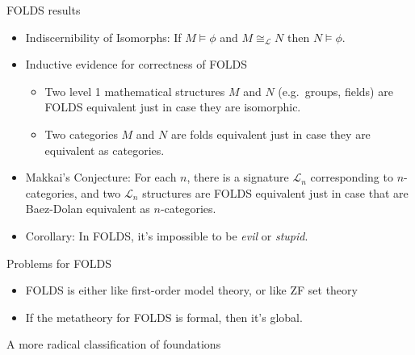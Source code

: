 \documentclass[8pt]{beamer}
\begin{document}
\begin{frame}{FOLDS results}

\begin{itemize}
\item Indiscernibility of Isomorphs: If $M\models \phi$ and $M\cong
  _{\mathcal{L}}N$ then $N\models\phi$.
\item Inductive evidence for correctness of FOLDS
\begin{itemize}
\item Two level 1 mathematical structures $M$ and $N$ (e.g.\ groups,
  fields) are FOLDS equivalent just in case they are isomorphic.
\item Two categories $M$ and $N$ are folds equivalent just in case
  they are equivalent as categories.
\end{itemize}
\item Makkai's Conjecture: For each $n$, there is a signature
  $\mathcal{L}_n$ corresponding to $n$-categories, and two
  $\mathcal{L}_n$ structures are FOLDS equivalent just in case that
  are Baez-Dolan equivalent as $n$-categories.
\item Corollary: In FOLDS, it's impossible to be \emph{evil} or
  \emph{stupid}.
\end{itemize}


\end{frame}


\begin{frame}{Problems for FOLDS}

\begin{itemize}
\item FOLDS is either like first-order model theory, or like ZF set
  theory
\item If the metatheory for FOLDS is formal, then it's global.
\end{itemize}


\end{frame}


\begin{frame}{A more radical classification of foundations}



\end{frame}
\end{document}
